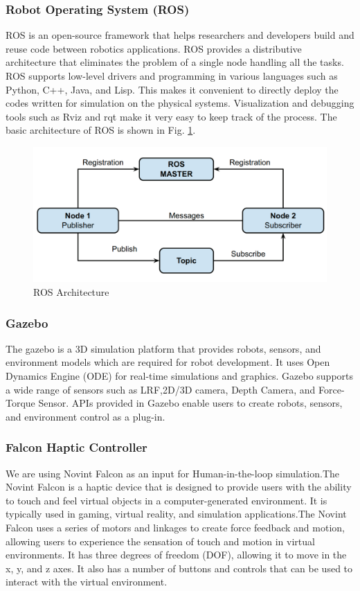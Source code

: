 \documentclass[letterpaper, 10 pt, conference]{ieeeconf}
\begin{document}
\subsubsection{Robot Operating System (ROS)}
ROS is an open-source framework that helps researchers and developers build and reuse code between robotics applications. ROS provides a distributive architecture that eliminates the problem of a single node handling all the tasks. ROS supports low-level drivers and programming in various languages such as Python, C++, Java, and Lisp. This makes it convenient to directly deploy the codes written for simulation on the physical systems. Visualization and debugging tools such as Rviz and rqt make it very easy to keep track of the process\cite{ros}. The basic architecture of ROS is shown in Fig. \ref{Fig:ROS Architecture}.
\begin{figure}[!ht]
    \centering
    \includegraphics[scale=0.15]{ros-arch.png} %
    \caption{ROS Architecture}
    \label{Fig:ROS Architecture}
\end{figure}

\subsubsection{Gazebo}
The gazebo is a 3D simulation platform that provides robots, sensors, and environment models which are required for robot development. It uses Open Dynamics Engine (ODE) for real-time simulations and graphics. Gazebo supports a wide range of sensors such as LRF,2D/3D camera, Depth Camera, and Force-Torque Sensor. APIs provided in Gazebo enable users to create robots, sensors, and environment control as a plug-in.

\subsubsection{Falcon Haptic Controller}
We are using Novint Falcon as an input for Human-in-the-loop simulation.The Novint Falcon is a haptic device that is designed to provide users with the ability to touch and feel virtual objects in a computer-generated environment. It is typically used in gaming, virtual reality, and simulation applications.The Novint Falcon uses a series of motors and linkages to create force feedback and motion, allowing users to experience the sensation of touch and motion in virtual environments. It has three degrees of freedom (DOF), allowing it to move in the x, y, and z axes. It also has a number of buttons and controls that can be used to interact with the virtual environment.
\end{document}
